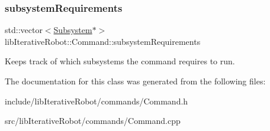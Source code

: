 \subsubsection{\texorpdfstring{subsystemRequirements}{subsystemRequirements}}
{\footnotesize\ttfamily std\+::vector$<$\mbox{\hyperlink{classlib_iterative_robot_1_1_subsystem}{Subsystem}}$\ast$$>$ lib\+Iterative\+Robot\+::\+Command\+::subsystem\+Requirements\hspace{0.3cm}{\ttfamily [private]}}



Keeps track of which subsystems the command requires to run. 

 

The documentation for this class was generated from the following files\+:\begin{DoxyCompactItemize}
\item 
include/lib\+Iterative\+Robot/commands/Command.\+h\item 
src/lib\+Iterative\+Robot/commands/Command.\+cpp\end{DoxyCompactItemize}
